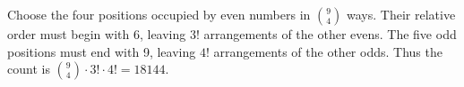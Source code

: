 Choose the four positions occupied by even numbers in $\binom94 $ ways. Their relative order must begin with 6, leaving $ 3!$ arrangements of the other evens. The five odd positions must end with 9, leaving $ 4!$ arrangements of the other odds. Thus the count is $\binom94\cdot3!\cdot4!=\boxed{18144}$.
